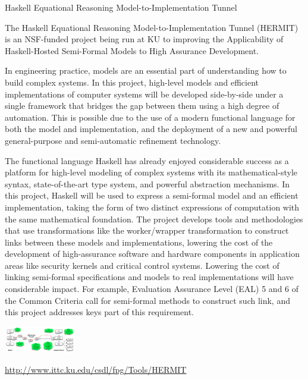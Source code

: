 \begin{hcarentry}{Haskell Equational Reasoning Model-to-Implementation Tunnel}
\label{HERMIT}
\makeheader

The Haskell Equational Reasoning Model-to-Implementation Tunnel (HERMIT) is an NSF-funded project being
run at KU to improving the Applicability of Haskell-Hosted Semi-Formal Models to High Assurance Development.

In engineering practice, models are an essential part of understanding how to build complex systems. In this project, high-level models and efficient implementations of computer systems will be developed side-by-side under a single framework that bridges the gap between them using a high degree of automation. This is possible due to the use of a modern functional language for both the model and implementation, and the deployment of a new and powerful general-purpose and semi-automatic refinement technology.

The functional language Haskell has already enjoyed considerable success as a platform for high-level modeling of complex systems with its mathematical-style syntax, state-of-the-art type system, and powerful abstraction mechanisms. In this project, Haskell will be used to express a semi-formal model and an efficient implementation, taking the form of two distinct expressions of computation with the same mathematical foundation. The project develops tools and methodologies that use transformations like the worker/wrapper transformation to construct links between these models and implementations, lowering the cost of the development of high-assurance software and hardware components in application areas like security kernels and critical control systems. Lowering the cost of linking semi-formal specifications and models to real implementations will have considerable impact. For example, Evaluation Assurance Level (EAL) 5 and 6 of the Common Criteria call for semi-formal methods to construct such link, and this project addresses keys part of this requirement. 

\begin{center}
\includegraphics[width=0.235\textwidth]{html/HERMIT-tunnel.png}
\end{center}



\FurtherReading
  \url{http://www.ittc.ku.edu/csdl/fpg/Tools/HERMIT}
\end{hcarentry}
